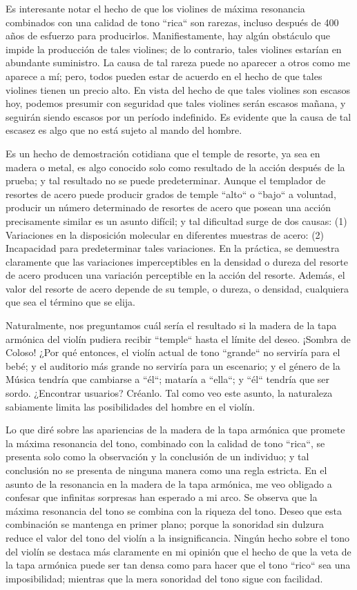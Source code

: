\documentclass[12pt]{book}
\begin{document}
Es interesante notar el hecho de que los violines de máxima resonancia combinados con una calidad de tono ``rica`` son rarezas, incluso después de 400 años de esfuerzo para producirlos. Manifiestamente, hay algún obstáculo que impide la producción de tales violines; de lo contrario, tales violines estarían en abundante suministro. La causa de tal rareza puede no aparecer a otros como me aparece a mí; pero, todos pueden estar de acuerdo en el hecho de que tales violines tienen un precio alto. En vista del hecho de que tales violines son escasos hoy, podemos presumir con seguridad que tales violines serán escasos mañana, y seguirán siendo escasos por un período indefinido. Es evidente que la causa de tal escasez es algo que no está sujeto al mando del hombre.

Es un hecho de demostración cotidiana que el temple de resorte, ya sea en madera o metal, es algo conocido solo como resultado de la acción después de la prueba; y tal resultado no se puede predeterminar. Aunque el templador de resortes de acero puede producir grados de temple ``alto`` o ``bajo`` a voluntad, producir un número determinado de resortes de acero que posean una acción precisamente similar es un asunto difícil; y tal dificultad surge de dos causas: (1) Variaciones en la disposición molecular en diferentes muestras de acero: (2) Incapacidad para predeterminar tales variaciones. En la práctica, se demuestra claramente que las variaciones imperceptibles en la densidad o dureza del resorte de acero producen una variación perceptible en la acción del resorte. Además, el valor del resorte de acero depende de su temple, o dureza, o densidad, cualquiera que sea el término que se elija.

Naturalmente, nos preguntamos cuál sería el resultado si la madera de la tapa armónica del violín pudiera recibir ``temple`` hasta el límite del deseo. ¡Sombra de Coloso! ¿Por qué entonces, el violín actual de tono ``grande`` no serviría para el bebé; y el auditorio más grande no serviría para un escenario; y el género de la Música tendría que cambiarse a ``él``; mataría a ``ella``; y ``él`` tendría que ser sordo. ¿Encontrar usuarios? Créanlo. Tal como veo este asunto, la naturaleza sabiamente limita las posibilidades del hombre en el violín.

Lo que diré sobre las apariencias de la madera de la tapa armónica que promete la máxima resonancia del tono, combinado con la calidad de tono ``rica``, se presenta solo como la observación y la conclusión de un individuo; y tal conclusión no se presenta de ninguna manera como una regla estricta. En el asunto de la resonancia en la madera de la tapa armónica, me veo obligado a confesar que infinitas sorpresas han esperado a mi arco. Se observa que la máxima resonancia del tono se combina con la riqueza del tono. Deseo que esta combinación se mantenga en primer plano; porque la sonoridad sin dulzura reduce el valor del tono del violín a la insignificancia. Ningún hecho sobre el tono del violín se destaca más claramente en mi opinión que el hecho de que la veta de la tapa armónica puede ser tan densa como para hacer que el tono ``rico`` sea una imposibilidad; mientras que la mera sonoridad del tono sigue con facilidad.
\end{document}
